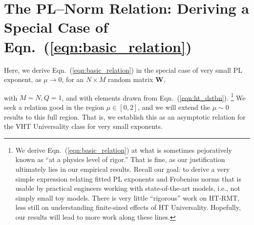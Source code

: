 

\newpage


\section{The PL--Norm Relation: Deriving a Special Case of Eqn.~(\ref{eqn:basic_relation})}
\label{sxn:appendix-derivation-pl-norm-relation}

Here, we derive Eqn.~(\ref{eqn:basic_relation}) in the special case of very small PL exponent, 
as 
$\mu \rightarrow 0$, 
for an $N \times M$ random matrix $\mathbf{W}$, {with $M=N, Q=1$, and with elements drawn from Eqn.~(\ref{eqn:ht_dstbn}).%
\footnote{We derive Eqn.~(\ref{eqn:basic_relation}) at what is sometimes pejoratively known as ``at a physics level of rigor.''  That is fine, as our justification ultimately lies in our empirical results.  Recall our goal: to derive a very simple expression relating fitted PL exponents and Frobenius norms that is usable by practical engineers working with state-of-the-art models, i.e., not simply small toy models.  There is very little ``rigorous'' work on HT-RMT, less still on understanding finite-sized effects of HT Universality.  Hopefully, our results will lead to more work along these lines.  }
We seek a relation good in the region $\mu\in[0,2]$, and we will extend the $\mu\sim 0$ results to this full region.
That is, we establish this as an asymptotic relation for the VHT Universality class for very small exponents.

}
